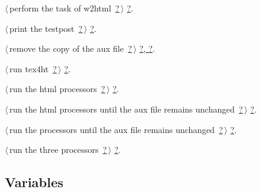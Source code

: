 \documentclass[twoside]{artikel3}
\renewcommand{\NWlink}[2]{\hyperlink{#1}{#2}}
\renewcommand{\NWlink}[2]{\hyperlink{#1}{#2}}
\begin{document}
{\begin{list}{}{\setlength{\itemsep}{-\parsep}\setlength{\itemindent}{-\leftmargin}}
\item $\langle\,$perform the task of w2html\nobreak\ {\footnotesize \NWlink{nuweb?}{?}}$\,\rangle$ {\footnotesize {\NWtxtRefIn} \NWlink{nuweb?}{?}.}
\item $\langle\,$print the testpost\nobreak\ {\footnotesize \NWlink{nuweb?}{?}}$\,\rangle$ {\footnotesize {\NWtxtRefIn} \NWlink{nuweb?}{?}.}
\item $\langle\,$remove the copy of the aux file\nobreak\ {\footnotesize \NWlink{nuweb?}{?}}$\,\rangle$ {\footnotesize {\NWtxtRefIn} \NWlink{nuweb?}{?}\NWlink{nuweb?}{, ?}.
}
\item $\langle\,$run tex4ht\nobreak\ {\footnotesize \NWlink{nuweb?}{?}}$\,\rangle$ {\footnotesize {\NWtxtRefIn} \NWlink{nuweb?}{?}.}
\item $\langle\,$run the html processors\nobreak\ {\footnotesize \NWlink{nuweb?}{?}}$\,\rangle$ {\footnotesize {\NWtxtRefIn} \NWlink{nuweb?}{?}.}
\item $\langle\,$run the html processors until the aux file remains unchanged\nobreak\ {\footnotesize \NWlink{nuweb?}{?}}$\,\rangle$ {\footnotesize {\NWtxtRefIn} \NWlink{nuweb?}{?}.}
\item $\langle\,$run the processors until the aux file remains unchanged\nobreak\ {\footnotesize \NWlink{nuweb?}{?}}$\,\rangle$ {\footnotesize {\NWtxtRefIn} \NWlink{nuweb?}{?}.}
\item $\langle\,$run the three processors\nobreak\ {\footnotesize \NWlink{nuweb?}{?}}$\,\rangle$ {\footnotesize {\NWtxtRefIn} \NWlink{nuweb?}{?}.}
\end{list}}

\subsection{Variables}
\label{sec:veriables}
\end{document}
